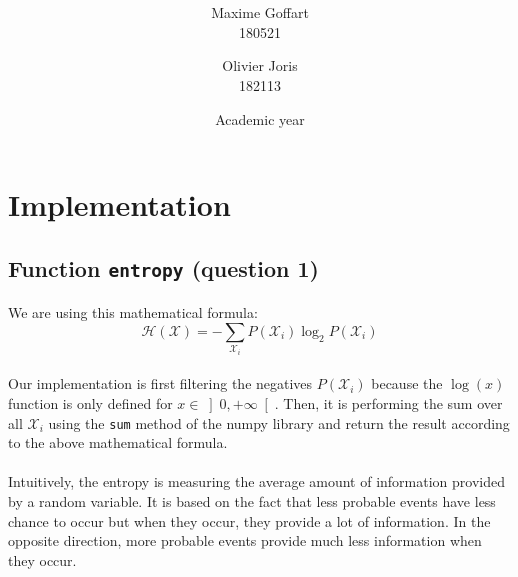 \documentclass[a4paper, 11pt, oneside]{article}
\title{\ClassName\\\vspace*{0.8cm}\ProjectName\vspace{1cm}}
\author{Maxime Goffart \\180521 \and Olivier Joris\\182113}
\date{\vspace{1cm}Academic year \AcademicYear}
\begin{document}
\begin{titlingpage}
{\let\newpage\relax\maketitle}
\end{titlingpage}

\thispagestyle{empty}
\newpage




\section{Implementation}

\subsection{Function \texttt{entropy} (question 1)}

\paragraph{}We are using this mathematical formula: 
$$ \mathcal{H}(\mathcal{X}) = - \sum_{\mathcal{X}_i} P(\mathcal{X}_i) \log_2{P(\mathcal{X}_i)} $$

\paragraph{}Our implementation is first filtering the negatives $P(\mathcal{X}_i)$ because 
the $\log(x)$ function is only defined for \(x \in \left]0, +\infty\right[\).
Then, it is performing the sum over all $\mathcal{X}_i$ using the \texttt{sum} method of the numpy library and return the result according to the above mathematical formula.

\paragraph{}Intuitively, the entropy is measuring the average amount of information provided by a random variable. It is based on the fact that less probable events have less chance to occur but when they occur, they provide a lot of information. In the opposite direction, more probable events provide much less information when they occur.
\end{document}
